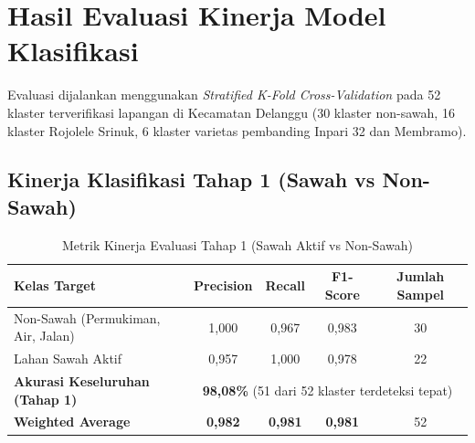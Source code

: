 \documentclass[11pt,a4paper]{article}
\begin{document}
\section{Hasil Evaluasi Kinerja Model Klasifikasi}

Evaluasi dijalankan menggunakan \textit{Stratified K-Fold Cross-Validation} pada 52 klaster terverifikasi lapangan di Kecamatan Delanggu (30 klaster non-sawah, 16 klaster Rojolele Srinuk, 6 klaster varietas pembanding Inpari 32 dan Membramo).

\subsection{Kinerja Klasifikasi Tahap 1 (Sawah vs Non-Sawah)}
\begin{table}[H]
    \centering\small
    \caption{Metrik Kinerja Evaluasi Tahap 1 (Sawah Aktif vs Non-Sawah)}
    \begin{tabularx}{\textwidth}{>{\raggedright\arraybackslash}Xcccc}
        \toprule
        \textbf{Kelas Target} & \textbf{Precision} & \textbf{Recall} & \textbf{F1-Score} & \textbf{Jumlah Sampel} \\
        \midrule
        Non-Sawah (Permukiman, Air, Jalan) & 1,000 & 0,967 & 0,983 & 30 \\
        Lahan Sawah Aktif                  & 0,957 & 1,000 & 0,978 & 22 \\
        \midrule
        \textbf{Akurasi Keseluruhan (Tahap 1)} & \multicolumn{4}{c}{\textbf{98,08\%} (51 dari 52 klaster terdeteksi tepat)} \\
        \textbf{Weighted Average}            & \textbf{0,982} & \textbf{0,981} & \textbf{0,981} & 52 \\
        \bottomrule
    \end{tabularx}
\end{table}
\end{document}
